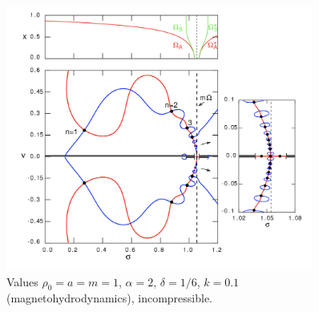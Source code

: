 \documentclass[12pt]{article}
\begin{document}
\newpage

\begin{figure}[t]
	\centering
	\includegraphics[width=0.9\textwidth]{RTI_MHD.png}
	\caption{Values $\rho_0 = a = m = 1$, $\alpha = 2$, $\delta = 1/6$, $k = 0.1$ (magnetohydrodynamics), incompressible.}
\end{figure}

\newpage



\end{document}
